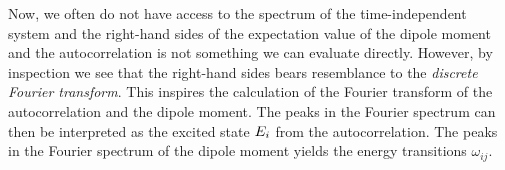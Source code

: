                 Now, we often do not have access to the spectrum of the
                time-independent system and the right-hand sides of the
                expectation value of the dipole moment and the autocorrelation
                is not something we can evaluate directly.
                However, by inspection we see that the right-hand sides bears
                resemblance to the \emph{discrete Fourier transform}.
                This inspires the calculation of the Fourier transform of the
                autocorrelation and the dipole moment.
                The peaks in the Fourier spectrum can then be interpreted as the
                excited state $E_i$ from the autocorrelation.
                The peaks in the Fourier spectrum of the dipole moment yields
                the energy transitions $\omega_{ij}$.


